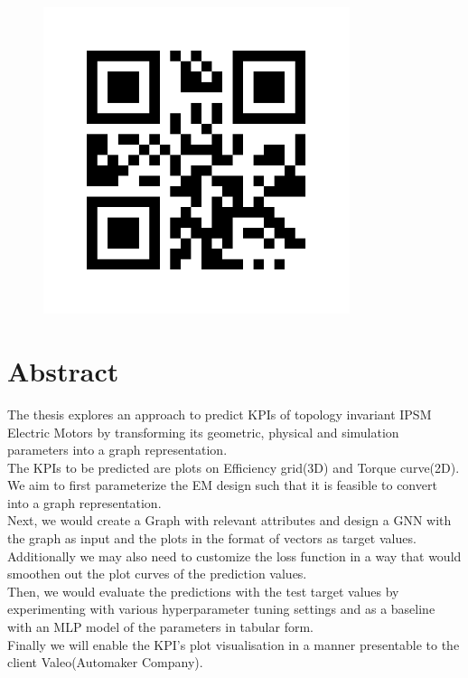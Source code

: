 \documentclass{report} %
\begin{document}
\newpage %


\begin{figure}[h]
    \includegraphics[width=0.8\textwidth]{./ReportImages/qrcode.png} %
    \label{fig:your-image}
\end{figure}

\newpage %

\chapter*{Abstract}

The thesis explores an approach to predict KPIs of topology invariant IPSM Electric Motors by transforming its geometric, physical and simulation parameters into a graph representation. \\
The KPIs to be predicted are plots on Efficiency grid(3D) and Torque curve(2D).\\
We aim to first parameterize the EM design such that it is feasible to convert into a graph representation. \\
Next, we would create a Graph with relevant attributes and design a GNN with the graph as input and the plots in the format of vectors as target values.\\
Additionally we may also need to customize the loss function in a way that would smoothen out the plot curves of the prediction values.\\
Then, we would evaluate the predictions with the test target values by experimenting with various hyperparameter tuning settings and as a baseline with an MLP model of the parameters in tabular form.\\
Finally we will enable the KPI's plot visualisation in a manner presentable to the client Valeo(Automaker Company).\\
\end{document}
